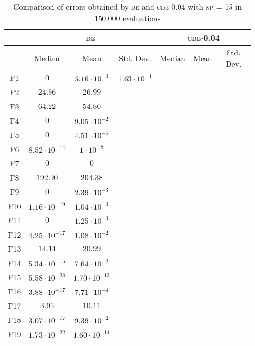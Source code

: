 \begin{table}[!t]
\caption{Comparison of errors obtained by \textsc{de} and \textsc{cde}-0.04 with \textsc{np} = 15 in 150.000 evaluations}
\label{tab:pop_15_50}
\centering
\begin{scriptsize}
\begin{tabular}{c || c c c | c c c }
\hline
 & \multicolumn{3}{|c|}{\textsc{de}} & \multicolumn{3}{|c}{\textsc{cde-0.04}} \\ \hline
    & Median                 & Mean                  & Std. Dev.  & Median & Mean & Std. Dev. \\ \hline
F1  & $0$                    & $5.16 \cdot 10^{-3}$  & $1.63 \cdot 10^{-1}$  & & & \\ \hline
F2  & $24.96$                & $26.99$               & & & & \\ \hline
F3  & $64.22$                & $54.86$               & & & & \\ \hline
F4  & $0$                    & $9.05 \cdot 10^{-2}$  & & & & \\ \hline
F5  & $0$                    & $4.51 \cdot 10^{-5}$  & & & & \\ \hline
F6  & $8.52 \cdot 10^{-14}$  & $1 \cdot 10^{-2} $    & & & & \\ \hline
F7  & $0$                    & $0$                   & & & & \\ \hline
F8  & $192.90$               & $204.38$              & & & & \\ \hline
F9  & $0$                    & $2.39 \cdot 10^{-3}$  & & & & \\ \hline
F10 & $1.16 \cdot 10^{-19}$  & $1.04 \cdot 10^{-3}$  & & & & \\ \hline
F11 & $0$                    & $1.25 \cdot 10^{-3}$  & & & & \\ \hline
F12 & $4.25 \cdot 10^{-17}$  & $1.08 \cdot 10^{-2}$  & & & & \\ \hline
F13 & $14.14$                & $20.99$               & & & & \\ \hline
F14 & $5.34 \cdot 10^{-15}$  & $7.64 \cdot 10^{-2}$  & & & & \\ \hline
F15 & $5.58 \cdot 10^{-28}$  & $1.70 \cdot 10^{-13}$ & & & & \\ \hline
F16 & $3.88 \cdot 10^{-17}$  & $7.71 \cdot 10^{-4}$  & & & & \\ \hline
F17 & $3.96$                 & $10.11$               & & & & \\ \hline
F18 & $3.07 \cdot 10^{-17}$  & $9.39 \cdot 10^{-2}$  & & & & \\ \hline
F19 & $1.73 \cdot 10^{-22}$  & $1.60 \cdot 10^{-14}$ & & & & \\ \hline
\end{tabular}
\end{scriptsize}
\end{table}
